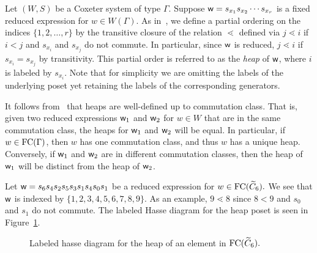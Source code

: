 Let $(W,S)$ be a Coxeter system of type $\Gamma$. Suppose $\mathsf{w}=s_{x_1}s_{x_2}\cdots s_{x_r}$ is a fixed reduced expression for $w \in W(\Gamma)$. As in~\cite{Stembridge1996}, we define a partial ordering on the indices $\{1, 2, \ldots, r\}$ by the transitive closure of the relation $\lessdot$ defined via $j \lessdot i$ if $i < j$ and $s_{x_i}$ and $s_{x_j}$ do not commute. In particular, since $\mathsf{w}$ is reduced, $j \lessdot i$ if $s_{x_i}=s_{x_j}$ by transitivity. This partial order is referred to as the \emph{heap} of $\mathsf{w}$, where $i$ is labeled by $s_{x_i}$. Note that for simplicity we are omitting the labels of the underlying poset yet retaining the labels of the corresponding generators.

It follows from~\cite{Stembridge1996} that heaps are well-defined up to commutation class. That is, given two reduced expressions $\mathsf{w}_1$ and $\mathsf{w}_2$ for $w \in W$ that are in the same commutation class, the heaps for $\mathsf{w}_1$ and $\mathsf{w}_2$ will be equal. In particular, if $w \in \mathrm{FC}(\Gamma)$, then $w$ has one commutation class, and thus $w$ has a unique heap. Conversely, if $\mathsf{w}_1$ and $\mathsf{w}_2$ are in different commutation classes, then the heap of $\mathsf{w}_1$ will be distinct from the heap of $\mathsf{w}_2$.

\begin{example}\label{ex:word}
Let $\mathsf{w}=s_6s_4s_2s_5s_3s_1s_4s_0s_1$ be a reduced expression for $w \in \mathrm{FC}(\widetilde{C}_6).$ We see that $\mathsf{w}$ is indexed by $\{1,2,3,4,5,6,7,8,9\}$. As an example, $9 \lessdot 8$ since $8 <9$ and $s_0$ and $s_1$ do not commute. The labeled Hasse diagram for the heap poset is seen in Figure~\ref{fig:Hasse}.
\begin{figure}[h]
\centering
{}
\caption{Labeled hasse diagram for the heap of an element in $\mathrm{FC}(\widetilde{C}_6).$}
\label{fig:Hasse}	
\end{figure}
\end{example}

